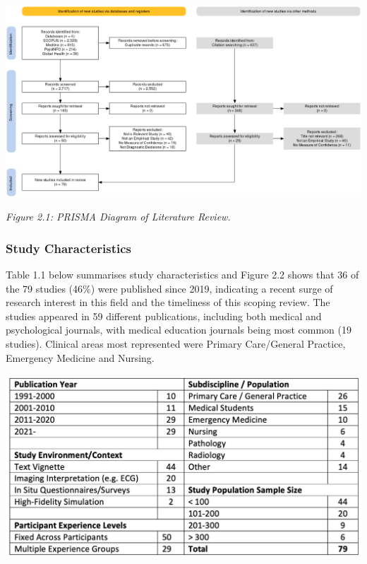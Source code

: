 \documentclass[a4paper, nobind]{templates/ociamthesis}
\begin{document}
\begin{center}\includegraphics[width=1.5\linewidth,height=0.5\textheight,angle=90]{./assets/PRISMA} \end{center}

\emph{Figure 2.1: PRISMA Diagram of Literature Review.}

\subsubsection*{Study Characteristics}\label{study-characteristics}

Table 1.1 below summarises study characteristics and Figure 2.2 shows that 36 of the 79 studies (46\%) were published since 2019, indicating a recent surge of research interest in this field and the timeliness of this scoping review. The studies appeared in 59 different publications, including both medical and psychological journals, with medical education journals being most common (19 studies). Clinical areas most represented were Primary Care/General Practice, Emergency Medicine and Nursing.

\begin{center}\includegraphics[width=1\linewidth]{./assets/ReviewTable} \end{center}
\end{document}
